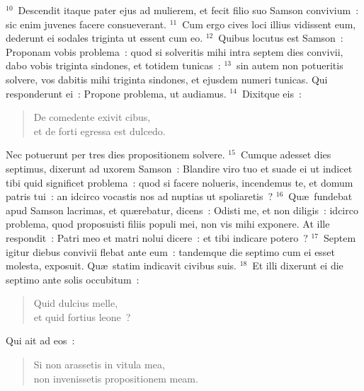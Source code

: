 ${}^{10}$~Descendit itaque pater ejus ad mulierem, et fecit filio suo Samson convivium~: sic enim juvenes facere consueverant.
${}^{11}$~Cum ergo cives loci illius vidissent eum, dederunt ei sodales triginta ut essent cum eo.
${}^{12}$~Quibus locutus est Samson~: Proponam vobis problema~: quod si solveritis mihi intra septem dies convivii, dabo vobis triginta sindones, et totidem tunicas~:
${}^{13}$~sin autem non potueritis solvere, vos dabitis mihi triginta sindones, et ejusdem numeri tunicas. Qui responderunt ei~: Propone problema, ut audiamus.
${}^{14}$~Dixitque eis~: \begin{flushleft}\begin{verse}De comedente exivit cibus,\\ et de forti egressa est dulcedo.\end{verse}\end{flushleft}

 Nec potuerunt per tres dies propositionem solvere.
${}^{15}$~Cumque adesset dies septimus, dixerunt ad uxorem Samson~: Blandire viro tuo et suade ei ut indicet tibi quid significet problema~: quod si facere nolueris, incendemus te, et domum patris tui~: an idcirco vocastis nos ad nuptias ut spoliaretis~?
${}^{16}$~Qu\ae\ fundebat apud Samson lacrimas, et qu\ae rebatur, dicens~: Odisti me, et non diligis~: idcirco problema, quod proposuisti filiis populi mei, non vis mihi exponere. At ille respondit~: Patri meo et matri nolui dicere~: et tibi indicare potero~?
${}^{17}$~Septem igitur diebus convivii flebat ante eum~: tandemque die septimo cum ei esset molesta, exposuit. Qu\ae\ statim indicavit civibus suis.
${}^{18}$~Et illi dixerunt ei die septimo ante solis occubitum~: \begin{flushleft}\begin{verse}Quid dulcius melle,\\ et quid fortius leone~?\end{verse}\end{flushleft}

 Qui ait ad eos~: \begin{flushleft}\begin{verse}Si non arassetis in vitula mea,\\ non invenissetis propositionem meam.\end{verse}\end{flushleft}


